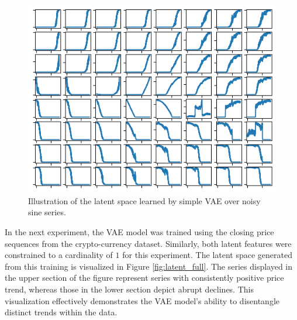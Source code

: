 \begin{figure}[h]
	\centering
	\includegraphics[scale=0.8]{./model_latent_sine.png}
	\caption{Illustration of the latent space learned by simple VAE over noisy sine series.}
	\label{fig:latent_sine}
\end{figure}

In the next experiment, the VAE model was trained using the closing price sequences from the crypto-currency dataset. Similarly, both latent features were constrained to a cardinality of $1$ for this experiment. The latent space generated from this training is visualized in Figure \ref{fig:latent_full}. The series displayed in the upper section of the figure represent series with consistently positive price trend, whereas those in the lower section depict abrupt declines. This visualization effectively demonstrates the VAE model's ability to disentangle distinct trends within the data.


%


